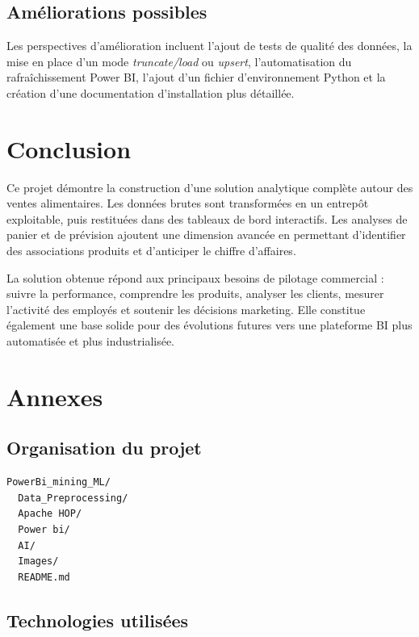 \documentclass[12pt,a4paper,twoside]{report}
\begin{document}
\section{Améliorations possibles}

Les perspectives d'amélioration incluent l'ajout de tests de qualité des données, la mise en place d'un mode \textit{truncate/load} ou \textit{upsert}, l'automatisation du rafraîchissement Power BI, l'ajout d'un fichier d'environnement Python et la création d'une documentation d'installation plus détaillée.

\chapter{Conclusion}

Ce projet démontre la construction d'une solution analytique complète autour des ventes alimentaires. Les données brutes sont transformées en un entrepôt exploitable, puis restituées dans des tableaux de bord interactifs. Les analyses de panier et de prévision ajoutent une dimension avancée en permettant d'identifier des associations produits et d'anticiper le chiffre d'affaires.

La solution obtenue répond aux principaux besoins de pilotage commercial : suivre la performance, comprendre les produits, analyser les clients, mesurer l'activité des employés et soutenir les décisions marketing. Elle constitue également une base solide pour des évolutions futures vers une plateforme BI plus automatisée et plus industrialisée.

\appendix

\chapter{Annexes}

\section{Organisation du projet}

\begin{lstlisting}[caption={Structure synthétique du répertoire projet}]
PowerBi_mining_ML/
  Data_Preprocessing/
  Apache HOP/
  Power bi/
  AI/
  Images/
  README.md
\end{lstlisting}

\section{Technologies utilisées}
\end{document}
